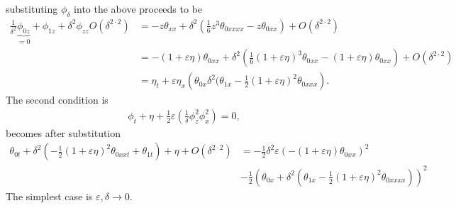 substituting $\phi_\delta$ into the above proceeds to be
\begin{align}
    \frac{1}{\delta^2}\underbrace{\phi_{0z}}_{=0} + \phi_{1z}+ \delta^2\phi_{zz}
    O(\delta^{2\cdot 2})
    &= -z\theta_{x x} + \delta^2\left( \frac{1}{6}z^3\theta_{0 x x x x} - z
    \theta_{0x x} \right) + O(\delta^{2\cdot 2})\\
    &=-(1+\varepsilon\eta)\theta_{0 x x} + \delta^2\left(
    \frac{1}{6}(1+\varepsilon\eta)^3\theta_{0 x x} -
(1+\varepsilon\eta)\theta_{0 x x} \right) +O(\delta^{2\cdot 2})\\
    &= \eta_t + \varepsilon\eta_x \left( \theta_{0x}
    \delta^2(\theta_{1x}-\frac{1}{2}( 1+ \varepsilon\eta)^2 \theta_{0x x x}
\right).
\end{align}
The second condition is
\begin{align}
    \phi_t + \eta + \frac{1}{2}\varepsilon \left( \frac{1}{\delta}\phi^2_z
    \phi_x^2\right)  = 0,
\end{align}
becomes after substitution
\begin{align}
    \theta_{0t}+ \delta^2\left( -\frac{1}{2}(1+\varepsilon\eta)^2\theta_{0 x xt}
    + \theta_{1t}\right) + \eta + O(\delta^{2\cdot 2})
    &=-\frac{1}{2}\delta^2\varepsilon(-(1+\varepsilon\eta)\theta_{0 x x
    })^2\\
    &-\frac{1}{2}\left( \theta_{0 x} + \delta^2\left( \theta_{1x} -
    \frac{1}{2}(1+\varepsilon\eta)^2\theta_{0 x x x x}  \right)  \right) ^2
\end{align}
The simplest case is $\varepsilon,\delta \rightarrow 0$.












\newpage




\nocite{johnson_1997}
\nocite{vallis_2017}
\nocite{constantin_tsunami}
\nocite{rupert_2009}
\nocite{mathe-physik}

\printbibliography


